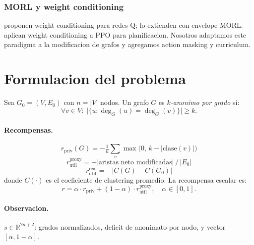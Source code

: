 \documentclass[10pt,twocolumn,letterpaper]{article}
\newcommand{\rpriv}{r_{\text{priv}}}
\newcommand{\rutil}{r_{\text{util}}}
\begin{document}
\subsubsection*{MORL y weight conditioning}
\citet{Abels2019} proponen weight conditioning para redes Q; \citet{Yang2019} lo
extienden con envelope MORL. \citet{Hung2022} aplican weight conditioning a PPO para
planificacion. Nosotros adaptamos este paradigma a la modificacion de grafos y
agregamos action masking y curriculum.

\section{Formulacion del problema}

Sea $G_0 = (V, E_0)$ con $n = |V|$ nodos. Un grafo $G$ es \emph{$k$-anonimo por
grado} si:
\begin{equation}
  \forall v \in V:\; \bigl|\{u : \deg_G(u) = \deg_G(v)\}\bigr| \geq k.
\end{equation}

\paragraph{Recompensas.}
\begin{equation}
  \rpriv(G) = -\tfrac{1}{n}\!\sum_{v}\max\!\bigl(0,\,k - |\text{clase}(v)|\bigr)
\end{equation}
\vspace{-8pt}
\begin{equation}
  \rutil^{\text{proxy}} = -|\text{aristas neto modificadas}|\,/\,|E_0|
\end{equation}
\vspace{-8pt}
\begin{equation}
  \rutil^{\text{real}} = -|C(G) - C(G_0)|
\end{equation}
donde $C(\cdot)$ es el coeficiente de clustering promedio. La recompensa escalar es:
\begin{equation}
  r = \alpha\cdot\rpriv + (1{-}\alpha)\cdot\rutil^{\text{proxy}},\quad \alpha\in[0,1].
\end{equation}

\paragraph{Observacion.}
$s \in \mathbb{R}^{2n+2}$: grados normalizados, deficit de anonimato por nodo, y
vector $[\alpha, 1{-}\alpha]$.
\end{document}
